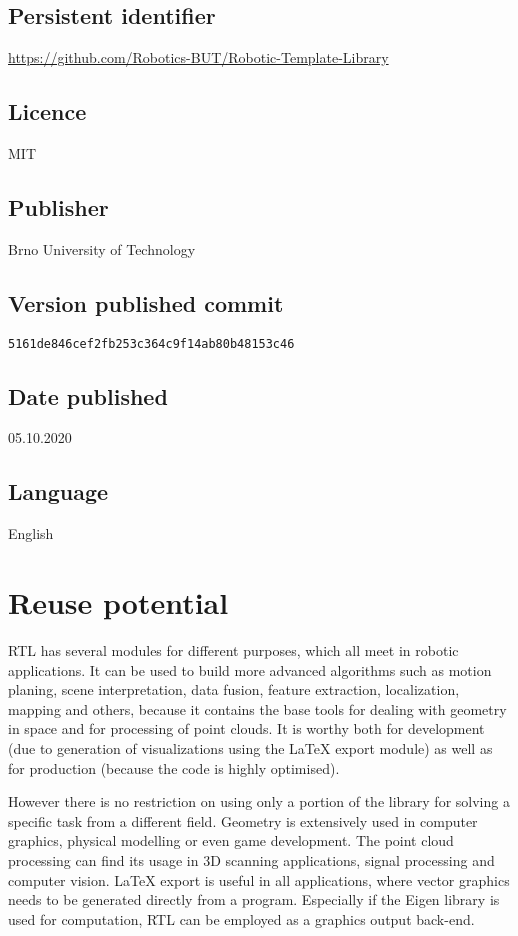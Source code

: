 \documentclass[
    letterpaper, 
    10 pt, 
    conference,
    table,
]{ieeeconf}
\begin{document}
\subsection*{Persistent identifier}
\url{https://github.com/Robotics-BUT/Robotic-Template-Library}

\subsection*{Licence}
MIT

\subsection*{Publisher} 
Brno University of Technology

\subsection*{Version published commit}
\texttt{5161de846cef2fb253c364c9f14ab80b48153c46}

\subsection*{Date published}
05.10.2020


\subsection*{Language}
English

\section*{Reuse potential}

RTL has several modules for different purposes, which all meet in robotic applications. It can be used to build more advanced algorithms such as motion planing, scene interpretation, data fusion, feature extraction, localization, mapping and others, because it contains the base tools for dealing with geometry in space and for processing of point clouds. It is worthy both for development (due to generation of visualizations using the LaTeX export module) as well as for production (because the code is highly optimised). 

However there is no restriction on using only a portion of the library for solving a specific task from a different field. Geometry is extensively used in computer graphics, physical modelling or even game development. The point cloud processing can find its usage in 3D scanning applications, signal processing and computer vision. LaTeX export is useful in all applications, where vector graphics needs to be generated directly from a program. Especially if the Eigen library is used for computation, RTL can be employed as a graphics output back-end.
\end{document}
